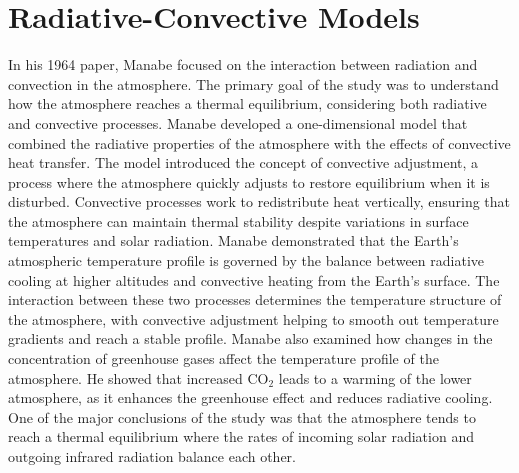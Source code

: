 \section{Radiative-Convective Models}
In his 1964 paper, Manabe\cite{Man64} focused on the interaction between radiation and convection in the atmosphere. The primary goal of the study was to understand how the atmosphere reaches a thermal equilibrium, considering both radiative and convective processes. Manabe developed a one-dimensional model that combined the radiative properties of the atmosphere with the effects of convective heat transfer. The model introduced the concept of convective adjustment, a process where the atmosphere quickly adjusts to restore equilibrium when it is disturbed. Convective processes work to redistribute heat vertically, ensuring that the atmosphere can maintain thermal stability despite variations in surface temperatures and solar radiation. Manabe demonstrated that the Earth's atmospheric temperature profile is governed by the balance between radiative cooling at higher altitudes and convective heating from the Earth's surface. The interaction between these two processes determines the temperature structure of the atmosphere, with convective adjustment helping to smooth out temperature gradients and reach a stable profile. Manabe also examined how changes in the concentration of greenhouse gases affect the temperature profile of the atmosphere. He showed that increased CO$_2$ leads to a warming of the lower atmosphere, as it enhances the greenhouse effect and reduces radiative cooling. One of the major conclusions of the study was that the atmosphere tends to reach a thermal equilibrium where the rates of incoming solar radiation and outgoing infrared radiation balance each other.




